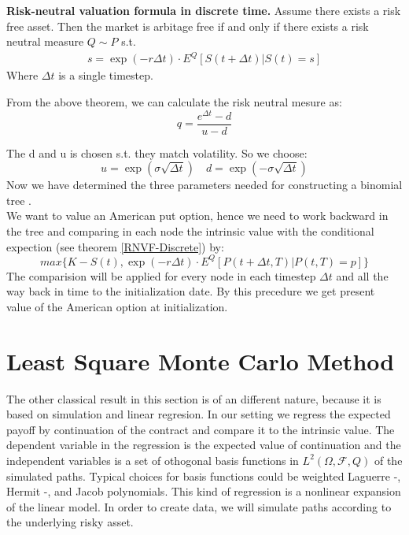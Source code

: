 \begin{theorem}\label{RNVF-Discrete}
\textbf{Risk-neutral valuation formula in discrete time. }
Assume there exists a risk free asset. Then the market is arbitage free if and only if there exists a risk neutral measure $Q \sim P$ s.t.
\begin{align}
s= \exp(- r \Delta t) \cdot E^Q[S(t+\Delta t)|S(t)=s] 
\end{align}
Where $\Delta t$ is a single timestep.
\end{theorem}
From the above theorem, we can calculate the risk neutral mesure as:\\
$$q=\frac{e^{\Delta t}-d}{u-d}$$

The d and u is chosen s.t. they match volatility. So we choose:
$$u= \exp(\sigma \sqrt{\Delta t}) \quad d= \exp(-\sigma \sqrt{\Delta t})$$
Now we have determined the three parameters needed for constructing a binomial tree \parencite{binomial-Paper} \parencite{Hull} \parencite{finKont}.\\

We want to value an American put option, hence we need to work backward in the tree and comparing in each node the intrinsic value with the conditional expection (see theorem \ref{RNVF-Discrete}) by:
\begin{equation}
max\{ K-S(t), \exp(- r \Delta t) \cdot E^Q[P(t+\Delta t,T)|P(t,T)=p] \}
\end{equation}
The comparision will be applied for every node in each timestep $\Delta t$  and all the way back in time to the initialization date. By this precedure we get present value of the American option at initialization.




\section{Least Square Monte Carlo Method}
The other classical result in this section is of an different nature, because it is based on simulation and linear regresion. In our setting we regress the expected payoff by continuation of the contract and compare it to the intrinsic value. The dependent variable in the regression is the expected value of continuation and the independent variables is a set of othogonal basis functions in $L^2(\Omega, \mathcal{F}, Q)$ of the simulated paths. Typical choices for basis functions could be weighted Laguerre -, Hermit -, and Jacob polynomials. This kind of regression is a nonlinear expansion of the linear model. In order to create data, we will simulate paths according to the underlying risky asset. 

